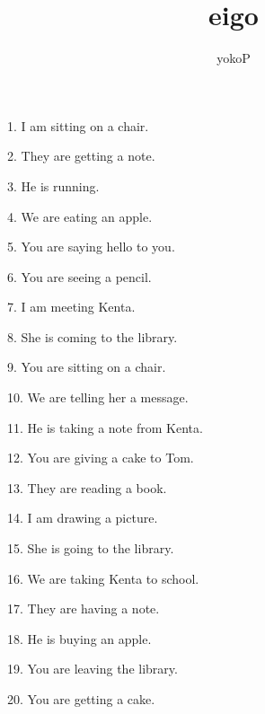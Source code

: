 \documentclass[uplatex,
paper=a4,
fontsize=18pt,
jafontsize=16pt,
number_of_lines=30,
line_length=30zh,
baselineskip=25pt,
]{jlreq}
\author{yokoP}
\title{eigo}
\begin{document}
1.  I am  sitting on a chair.

2.  They are  getting a note.

3.  He is  running.

4.  We are  eating an apple.

5.  You are  saying hello to you.

6.  You are  seeing a pencil.

7.  I am  meeting Kenta.

8.  She is  coming to the library.

9.  You are  sitting on a chair.

10.  We are  telling her a message.

11.  He is  taking a note from Kenta.

12.  You are  giving a cake to Tom.

13.  They are  reading a book.

14.  I am  drawing a picture.

15.  She is  going to the library.

16.  We are  taking Kenta to school.

17.  They are  having a note.

18.  He is  buying an apple.

19.  You are  leaving the library.

20.  You are  getting a cake.
\end{document}
